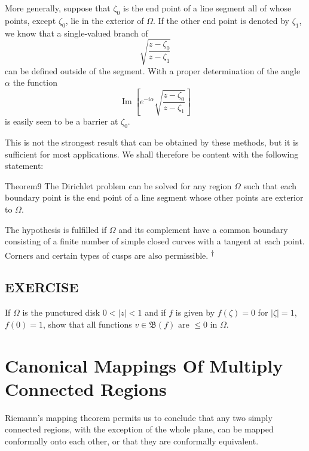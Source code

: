More generally, suppose that $\zeta_{0}$ is the end point of a line segment all of whose points, except $\zeta_{0}$, lie in the exterior of $\Omega$. If the other end point is denoted by $\zeta_{1}$, we know that a single-valued branch of
\begin{equation*}
\sqrt {\frac {z - \zeta_ {0}}{z - \zeta_ {1}}}
\end{equation*}
can be defined outside of the segment. With a proper determination of the angle $\alpha$ the function
\begin{equation*}
\operatorname{Im} \left[ e ^ {- i \alpha} \sqrt {\frac {z - \zeta_ {0}}{z - \zeta_ {1}}} \right]
\end{equation*}
is easily seen to be a barrier at $\zeta_{0}$.

This is not the strongest result that can be obtained by these methods, but it is sufficient for most applications. We shall therefore be content with the following statement:

\begin{originalstatement}{Theorem}{9}\label{thm:6.9}
The Dirichlet problem can be solved for any region $\Omega$ such that each boundary point is the end point of a line segment whose other points are exterior to $\Omega$.
\end{originalstatement}
The hypothesis is fulfilled if $\Omega$ and its complement have a common boundary consisting of a finite number of simple closed curves with a tangent at each point. Corners and certain types of cusps are also permissible. \hyperlink{fn:267:dagger}{\textsuperscript{\ensuremath{\dagger}}}

\subsection*{EXERCISE}
If $\Omega$ is the punctured disk $0 < |z| < 1$ and if $f$ is given by $f(\zeta) = 0$ for $|\zeta| = 1$, $f(0) = 1$, show that all functions $v \in \mathfrak{B}(f)$ are $\leq 0$ in $\Omega$.

\setcounter{section}{4}\section{Canonical Mappings Of Multiply Connected Regions}\label{sec:6.5}
Riemann's mapping theorem permits us to conclude that any two simply connected regions, with the exception of the whole plane, can be mapped conformally onto each other, or that they are conformally equivalent.

